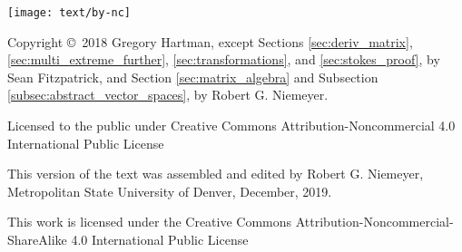 \noindent\hskip -1in\begin{minipage}{2in}
\texttt{[image: text/by-nc]} 
\end{minipage}
%
\begin{minipage}{3in}
\noindent Copyright \copyright\ 2018 Gregory Hartman, except Sections \ref{sec:deriv_matrix}, \ref{sec:multi_extreme_further}, \ref{sec:transformations}, and \ref{sec:stokes_proof}, by Sean Fitzpatrick, and Section \ref{sec:matrix_algebra} and Subsection \ref{subsec:abstract_vector_spaces}, by Robert G. Niemeyer.

Licensed to the public under Creative Commons Attribution-Noncommercial 4.0 International Public License
\end{minipage}

\bigskip

\bigskip



\bigskip

\begin{minipage}{3.3in}
This version of the text was assembled and edited by Robert G. Niemeyer, Metropolitan State University of Denver, December, 2019.

This work is licensed under the Creative Commons Attribution-Noncommercial-ShareAlike 4.0 International Public License
\end{minipage}
